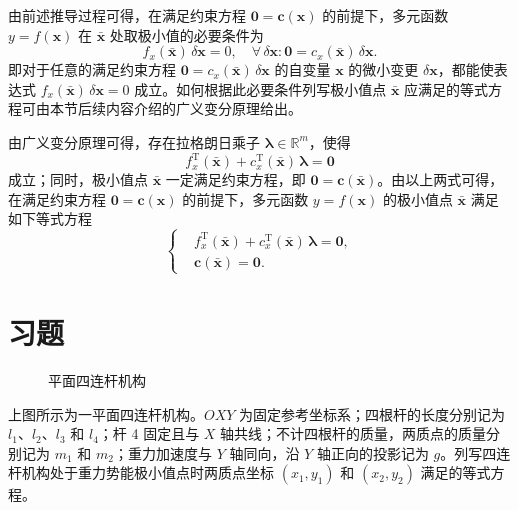 由前述推导过程可得，在满足约束方程 $\boldsymbol{0} = \boldsymbol{c}(\boldsymbol{x})$ 的前提下，多元函数 $y = f(\boldsymbol{x})$ 在 $\bar{\boldsymbol{x}}$ 处取极小值的必要条件为
\begin{equation*}
f_x(\bar{\boldsymbol{x}})\,\delta\boldsymbol{x} = 0, \quad \forall\, \delta\boldsymbol{x} : \boldsymbol{0} = c_x(\bar{\boldsymbol{x}})\,\delta\boldsymbol{x}.
\end{equation*}
即对于任意的满足约束方程 $\boldsymbol{0} = c_x(\bar{\boldsymbol{x}})\,\delta\boldsymbol{x}$ 的自变量 $\boldsymbol{x}$ 的微小变更 $\delta\boldsymbol{x}$，都能使表达式 $f_x(\bar{\boldsymbol{x}})\,\delta\boldsymbol{x} = 0$ 成立。如何根据此必要条件列写极小值点 $\bar{\boldsymbol{x}}$ 应满足的等式方程可由本节后续内容介绍的广义变分原理给出。

由广义变分原理可得，存在拉格朗日乘子 $\boldsymbol{\lambda} \in \mathbb{R}^m$，使得
\begin{equation*}
f_x^{\mathrm{T}}(\bar{\boldsymbol{x}}) + c_x^{\mathrm{T}}(\bar{\boldsymbol{x}})\,\boldsymbol{\lambda} = \boldsymbol{0}
\end{equation*}
成立；同时，极小值点 $\bar{\boldsymbol{x}}$ 一定满足约束方程，即 $\boldsymbol{0} = \boldsymbol{c}(\bar{\boldsymbol{x}})$。由以上两式可得，在满足约束方程 $\boldsymbol{0} = \boldsymbol{c}(\boldsymbol{x})$ 的前提下，多元函数 $y = f(\boldsymbol{x})$ 的极小值点 $\bar{\boldsymbol{x}}$ 满足如下等式方程
\begin{equation}\label{eq:lagrange_cond}
\left\{
\begin{aligned}
&f_x^{\mathrm{T}}(\bar{\boldsymbol{x}}) + c_x^{\mathrm{T}}(\bar{\boldsymbol{x}})\,\boldsymbol{\lambda} = \boldsymbol{0}, \\
&\boldsymbol{c}(\bar{\boldsymbol{x}}) = \boldsymbol{0}.
\end{aligned}
\right.
\end{equation}

\section*{习题}

\begin{figure}[htbp]
\centering
{}
\caption{平面四连杆机构}
\end{figure}

上图所示为一平面四连杆机构。$OXY$ 为固定参考坐标系；四根杆的长度分别记为 $l_1$、$l_2$、$l_3$ 和 $l_4$；杆 4 固定且与 $X$ 轴共线；不计四根杆的质量，两质点的质量分别记为 $m_1$ 和 $m_2$；重力加速度与 $Y$ 轴同向，沿 $Y$ 轴正向的投影记为 $g$。列写四连杆机构处于重力势能极小值点时两质点坐标 $(x_1, y_1)$ 和 $(x_2, y_2)$ 满足的等式方程。
